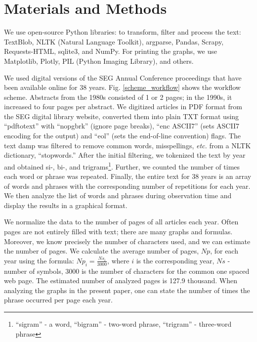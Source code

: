 \documentclass[geosciences,article,submit,moreauthors,pdftex]{Definitions/mdpi}
\begin{document}
\section{Materials and Methods}

We use open-source Python libraries: to transform, filter and process the text: TextBlob, NLTK (Natural Language Toolkit), argparse, Pandas, Scrapy, Requests-HTML, sqlite3, and NumPy. For printing the graphs, we use Matplotlib, Plotly, PIL (Python Imaging Library), and others.

We used digital versions of the SEG Annual Conference proceedings that have been available online for 38 years. Fig. \ref{scheme_workflow} shows the workflow scheme. Abstracts from the 1980s consisted of 1 or 2 pages; in the 1990s, it increased to four pages per abstract. We digitized articles in PDF format from the SEG digital library website, converted them into plain TXT format using ``pdftotext'' with ``nopgbrk'' (ignore page breaks), ``enc ASCII7'' (sets ASCII7 encoding for the output) and ``eol'' (sets the end-of-line convention) flags. The text damp was filtered to remove common words, misspellings, \textit{etc.} from a NLTK dictionary, ``stopwords.'' After the initial filtering, we tokenized the text by year and obtained si-, bi-, and trigrams\footnote{``sigram'' - a word, ``bigram'' - two-word phrase, ``trigram'' - three-word phrase}. Further, we counted the number of times each word or phrase was repeated. Finally, the entire text for 38 years is an array of words and phrases with the corresponding number of repetitions for each year. We then analyze the list of words and phrases during observation time and display the results in a graphical format. 


We normalize the data to the number of pages of all articles each year. Often pages are not entirely filled with text; there are many graphs and formulas. Moreover, we know precisely the number of characters used, and we can estimate the number of pages. We calculate the average number of pages, $Np$, for each year using the formula: $Np_i = \frac{Ns_i}{3000}$, where $i$ is the corresponding year, $Ns$ - number of symbols, 3000 is the number of characters for the common one spaced web page. The estimated number of analyzed pages is 127.9 thousand. When analyzing the graphs in the present paper, one can state the number of times the phrase occurred per page each year.
\end{document}
